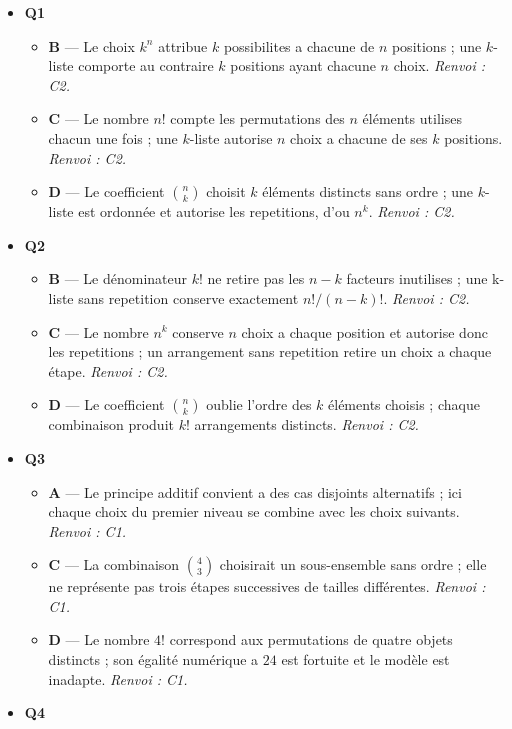 \begin{itemize}
  \item \textbf{Q1}
  \begin{itemize}
    \item \textbf{B} — Le choix $k^n$ attribue $k$ possibilites a chacune de $n$ positions ; une $k$-liste comporte au contraire $k$ positions ayant chacune $n$ choix. \emph{Renvoi : C2.}
    \item \textbf{C} — Le nombre $n!$ compte les permutations des $n$ éléments utilises chacun une fois ; une $k$-liste autorise $n$ choix a chacune de ses $k$ positions. \emph{Renvoi : C2.}
    \item \textbf{D} — Le coefficient $\binom{n}{k}$ choisit $k$ éléments distincts sans ordre ; une $k$-liste est ordonnée et autorise les repetitions, d'ou $n^k$. \emph{Renvoi : C2.}
  \end{itemize}
  \item \textbf{Q2}
  \begin{itemize}
    \item \textbf{B} — Le dénominateur $k!$ ne retire pas les $n-k$ facteurs inutilises ; une k-liste sans repetition conserve exactement $n!/(n-k)!$. \emph{Renvoi : C2.}
    \item \textbf{C} — Le nombre $n^k$ conserve $n$ choix a chaque position et autorise donc les repetitions ; un arrangement sans repetition retire un choix a chaque étape. \emph{Renvoi : C2.}
    \item \textbf{D} — Le coefficient $\binom{n}{k}$ oublie l'ordre des $k$ éléments choisis ; chaque combinaison produit $k!$ arrangements distincts. \emph{Renvoi : C2.}
  \end{itemize}
  \item \textbf{Q3}
  \begin{itemize}
    \item \textbf{A} — Le principe additif convient a des cas disjoints alternatifs ; ici chaque choix du premier niveau se combine avec les choix suivants. \emph{Renvoi : C1.}
    \item \textbf{C} — La combinaison $\binom{4}{3}$ choisirait un sous-ensemble sans ordre ; elle ne représente pas trois étapes successives de tailles différentes. \emph{Renvoi : C1.}
    \item \textbf{D} — Le nombre $4!$ correspond aux permutations de quatre objets distincts ; son égalité numérique a $24$ est fortuite et le modèle est inadapte. \emph{Renvoi : C1.}
  \end{itemize}
  \item \textbf{Q4}

\end{itemize}
